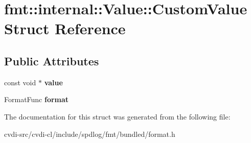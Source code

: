 \hypertarget{structfmt_1_1internal_1_1Value_1_1CustomValue}{}\section{fmt\+:\+:internal\+:\+:Value\+:\+:Custom\+Value Struct Reference}
\label{structfmt_1_1internal_1_1Value_1_1CustomValue}
\subsection*{Public Attributes}
\begin{DoxyCompactItemize}
\item 
const void $\ast$ {\bfseries value}\hypertarget{structfmt_1_1internal_1_1Value_1_1CustomValue_aaaa7c10023f8b3886bee9593cddea150}{}\label{structfmt_1_1internal_1_1Value_1_1CustomValue_aaaa7c10023f8b3886bee9593cddea150}

\item 
Format\+Func {\bfseries format}\hypertarget{structfmt_1_1internal_1_1Value_1_1CustomValue_a36f27ca0939e90a5fe6d7d355ea0f97a}{}\label{structfmt_1_1internal_1_1Value_1_1CustomValue_a36f27ca0939e90a5fe6d7d355ea0f97a}

\end{DoxyCompactItemize}


The documentation for this struct was generated from the following file\+:\begin{DoxyCompactItemize}
\item 
cvdi-\/src/cvdi-\/cl/include/spdlog/fmt/bundled/format.\+h\end{DoxyCompactItemize}

